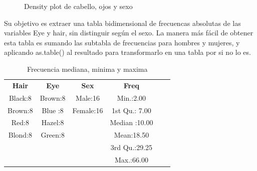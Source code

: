 \documentclass[12pt,a4paper]{article}
\begin{document}
\begin{figure}[h]
 \centering
 \caption{Density plot de cabello, ojos y sexo}
 \label{f:Density}
\end{figure}

Su objetivo es extraer una tabla bidimensional de frecuencas absolutas de las variables Eye y hair, sin distinguir según el sexo. La manera más fácil de obtener esta tabla es sumando las subtabla de frecuencias para hombres y mujeres, y aplicando as.table() al resultado para transformarlo en una tabla por si no lo es.


\begin{table}[ht]
\centering
\label{f:FrecuenciaMinMax}
\begin{tabular}{|c|c|c|c|ll}
\cline{1-4}
\textbf{Hair}  & \textbf{Eye}  & \textbf{Sex}   & \textbf{Freq}          &  &  \\ \cline{1-4}
Black:8 & Brown:8 & Male:16   & Min.:2.00     &  &  \\ \cline{1-4}
Brown:8 & Blue :8 & Female:16 & 1st Qu.: 7.00 &  &  \\ \cline{1-4}
Red:8    & Hazel:8 &           & Median :10.00 &  &  \\ \cline{1-4}
Blond:8 & Green:8 &           & Mean:18.50    &  &  \\ \cline{1-4}
        &         &           & 3rd Qu.:29.25 &  &  \\ \cline{1-4}
        &         &           & Max.:66.00    &  &  \\ \cline{1-4}
\end{tabular}
   
 \caption{Frecuencia mediana, minima y maxima}
\label{f:FrecuenciaMedMinMax}
\end{table}
\end{document}
